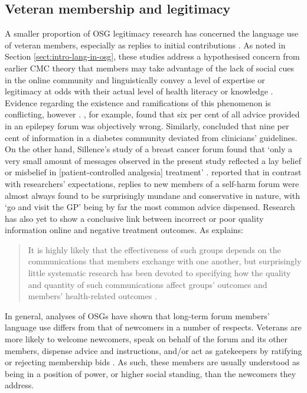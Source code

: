 \subsection{Veteran membership and legitimacy} \label{sect:vetmemb}

A smaller proportion of \gls{OSG} legitimacy research has concerned the language use of veteran members, especially as replies to initial contributions \cite{paulus_`please_2015}. As noted in Section \ref{sect:intro-lang-in-osg}, these studies address a hypothesised concern from earlier \gls{CMC} theory that \glspl{member} may take advantage of the lack of social cues in the online community and linguistically convey a level of expertise or legitimacy at odds with their actual level of health literacy or knowledge \cite{varga2014grieving}. Evidence regarding the existence and ramifications of this phenomenon is conflicting, however \cite{sillence_giving_2013}. \textcite{hoch_information_1999}, for example, found that six per cent of all advice provided in an epilepsy \gls{forum} was objectively wrong. Similarly, \textcite{hoffman-goetz_clinical_2009} concluded that nine per cent of information in a diabetes community deviated from clinicians' guidelines. On the other hand, Sillence's study of a breast cancer \gls{forum} found that `only a very small amount of messages observed in the present study reflected a lay belief or misbelief in [patient-controlled analgesia] treatment' \parencite*[p.~8]{sillence_communicating_2012}. \textcite{smithson_problem_2011} reported that in contrast with researchers' expectations, replies to new \glspl{member} of a self\hyp{}harm \gls{forum} were almost always found to be surprisingly mundane and conservative in nature, with `go and visit the GP' being by far the most common advice dispensed. Research has also yet to show a conclusive link between incorrect or poor quality information online and negative treatment outcomes. As \citeauthor{wang_stay_2012} explains:

\begin{quote}\small\singlespacing
It is highly likely that the effectiveness of such groups depends on the communications that \glspl{member} exchange with one another, but surprisingly little systematic research has been devoted to specifying how the quality and quantity of such communications affect groups' outcomes and members' health\hyp{}related outcomes \parencite*[p.~1]{wang_stay_2012}.
\end{quote}

In general, analyses of \glspl{OSG} have shown that long\hyp{}term \gls{forum} \glspl{member}' language use differs from that of newcomers in a number of respects. Veterans are more likely to welcome newcomers, speak on behalf of the \gls{forum} and its other members, dispense advice and instructions, and\slash or act as gatekeepers by ratifying or rejecting membership bids \cite{paulus_`please_2015,pederson_supporting_2010,weber_missed_2011}. As such, these \glspl{member} are usually understood as being in a position of power, or higher social standing, than the newcomers they address.

